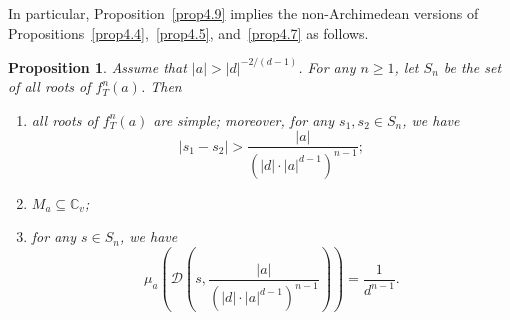 \documentclass[10pt,a4paper]{amsart}
\numberwithin{equation}{section}
\theoremstyle{plain}
\newtheorem{prop}[thm]{Proposition}
\theoremstyle{definition}
\theoremstyle{remark}
\newcommand{\C}{\mathbb C}
\begin{document}
In particular, Proposition~\ref{prop4.9} implies the non-Archimedean
versions of Propositions~\ref{prop4.4},~\ref{prop4.5}, and~\ref{prop4.7}
as follows.

\begin{prop}\label{prop4.10}
  Assume that $|a|>|d|^{-2/(d-1)}$. For any $n\geq1$,
let $S_{n}$ be the set of all roots of $f_{T}^{n}(a)$. Then  
\begin{enumerate}
\item\label{p4.10-1} all roots of $f_{T}^{n}(a)$ are simple; moreover, for any $s_{1},s_{2}\in S_{n}$,
we have
\[
|s_{1}-s_{2}|>\frac{|a|}{\left(|d|\cdot|a|^{d-1}\right)^{n-1}};
\]
\item\label{p4.10-2}  $M_{a}\subseteq\C_{v}$;
\item\label{p4.10-3} for any $s\in S_{n}$, we have
\[
\mu_{a}\left(\mathcal{D}\left(s,\frac{|a|}{\left(|d|\cdot|a|^{d-1}\right)^{n-1}}\right)\right)=\frac{1}{d^{n-1}}.
\]
\end{enumerate}
\end{prop}
\end{document}
